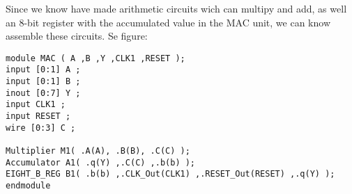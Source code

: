 Since we know have made arithmetic circuits wich can multipy and add, as well an 8-bit register with the accumulated value in the MAC unit, we can know assemble these circuits. Se figure: 

 


\begin{lstlisting}
module MAC ( A ,B ,Y ,CLK1 ,RESET );
input [0:1] A ;
input [0:1] B ;
inout [0:7] Y ;
input CLK1 ;
input RESET ;
wire [0:3] C ;

Multiplier M1( .A(A), .B(B), .C(C) ); 
Accumulator A1( .q(Y) ,.C(C) ,.b(b) ); 
EIGHT_B_REG B1( .b(b) ,.CLK_Out(CLK1) ,.RESET_Out(RESET) ,.q(Y) );
endmodule
\end{lstlisting}

